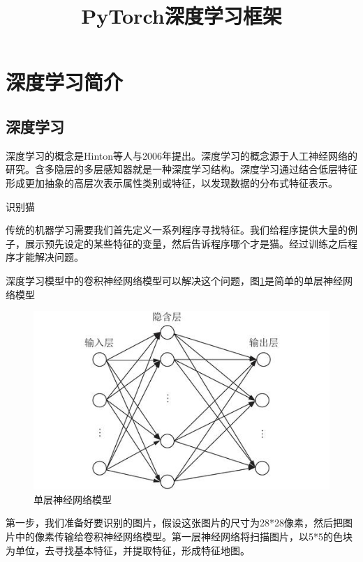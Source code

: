 \documentclass[openbib]{article}
\begin{document}
	
	\title{PyTorch深度学习框架}
	
	
	\maketitle
	
	\newpage
	\tableofcontents
	\newpage
\section{深度学习简介}
	\subsection{深度学习}
	深度学习的概念是Hinton等人与2006年提出。深度学习的概念源于人工神经网络的研究。含多隐层的多层感知器就是一种深度学习结构。深度学习通过结合低层特征形成更加抽象的高层次表示属性类别或特征，以发现数据的分布式特征表示。
	\begin{center}
		\Large{识别猫}
	\end{center}	

	传统的机器学习需要我们首先定义一系列程序寻找特征。我们给程序提供大量的例子，展示预先设定的某些特征的变量，然后告诉程序哪个才是猫。经过训练之后程序才能解决问题。
	
	深度学习模型中的卷积神经网络模型可以解决这个问题，图\ref{a}是简单的单层神经网络模型
	
		\begin{figure}[htbp]
		\centering
		\includegraphics[scale=4]{单层神经网络模型}
		\caption{单层神经网络模型}
		\label{a}
		\end{figure}

	第一步，我们准备好要识别的图片，假设这张图片的尺寸为28*28像素，然后把图片中的像素传输给卷积神经网络模型。第一层神经网络将扫描图片，以5*5的色块为单位，去寻找基本特征，并提取特征，形成特征地图。
	
\end{document}
